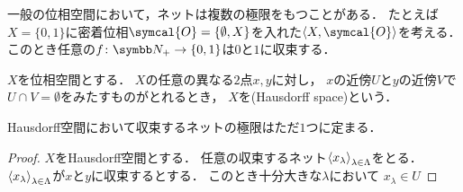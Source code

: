 \documentclass[../main.tex]{subfiles}
\begin{document}
一般の位相空間において，ネットは複数の極限をもつことがある．
たとえば\(X = \{0, 1\}\)に密着位相\(\symcal{O} = \{\emptyset, X\}\)を入れた\(\tuple{X, \symcal{O}}\)を考える．
このとき任意の\(f\colon \PositiveInteger \to \{0, 1\}\)は\(0\)と\(1\)に収束する．

\begin{thmbox}
\begin{definition}
\(X\)を位相空間とする．
\(X\)の任意の異なる\(2\)点\(x, y\)に対し，
\(x\)の近傍\(U\)と\(y\)の近傍\(V\)で\(U \cap V = \emptyset\)をみたすものがとれるとき，
\(X\)を(Hausdorff space)という．
\end{definition}
\end{thmbox}

\begin{thmbox}
\begin{proposition}
Hausdorff空間において収束するネットの極限はただ\(1\)つに定まる．
\end{proposition}
\end{thmbox}

\begin{proof} \(X\)をHausdorff空間とする．
任意の収束するネット\({\langle {x}_\lambda \rangle}_{\lambda \in \Lambda}\)をとる．
\({\langle {x}_\lambda \rangle}_{\lambda \in \Lambda}\)が\(x\)と\(y\)に収束するとする．
このとき十分大きな\(\lambda\)において
\(x_\lambda \in U\)
\end{proof}

\end{document}
